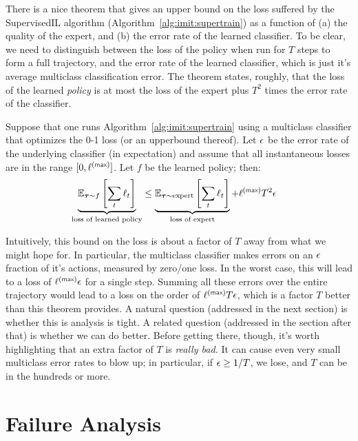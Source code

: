 There is a nice theorem that gives an upper bound on the loss suffered by the SupervisedIL algorithm (Algorithm~\ref{alg:imit:supertrain}) as a function of (a) the quality of the expert, and (b) the error rate of the learned classifier.
To be clear, we need to distinguish between the loss of the policy when run for $T$ steps to form a full trajectory, and the error rate of the learned classifier, which is just it's average multiclass classification error.
The theorem states, roughly, that the loss of the learned \emph{policy} is at most the loss of the expert plus $T^2$ times the error rate of the classifier.

\begin{theorem}
  Suppose that one runs Algorithm~\ref{alg:imit:supertrain} using a multiclass classifier that optimizes the 0-1 loss (or an upperbound thereof).
  Let $\epsilon$ be the error rate of the underlying classifier (in expectation) and assume that all instantaneous losses are in the range $[0, \ell\xth{max}]$.
  Let $f$ be the learned policy; then:
  \begin{align}
    \underbrace{\Ep_{\vt \sim f}\left[\sum_t \ell_t\right]}_{\text{loss of learned policy}}
    & \leq
    \underbrace{\Ep_{\vt \sim \text{expert}}\left[\sum_t \ell_t\right]}_{\text{loss of expert}}
      + \ell\xth{max} T^2 \ep
  \end{align}
\end{theorem}

Intuitively, this bound on the loss is about a factor of $T$ away from what we might hope for.
In particular, the multiclass classifier makes errors on an $\epsilon$ fraction of it's actions, measured by zero/one loss.
In the worst case, this will lead to a loss of $\ell\xth{max}\ep$ for a single step.
Summing all these errors over the entire trajectory would lead to a loss on the order of $\ell\xth{max}T\ep$, which is a factor $T$ better than this theorem provides.
A natural question (addressed in the next section) is whether this is analysis is tight.
A related question (addressed in the section after that) is whether we can do better.
Before getting there, though, it's worth highlighting that an extra factor of $T$ is \emph{really bad.} It can cause even very small multiclass error rates to blow up; in particular, if $\epsilon \geq 1/T$, we lose, and $T$ can be in the hundreds or more.

\section{Failure Analysis}

